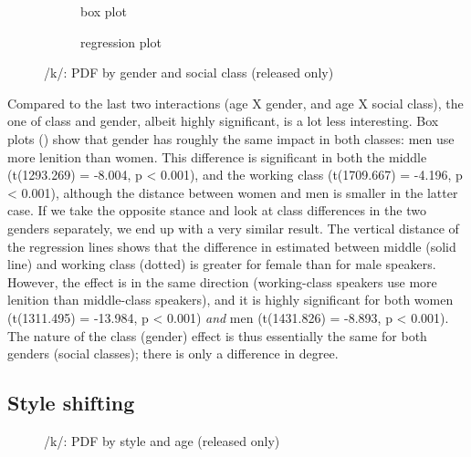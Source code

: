 \begin{figure}[h]
	\centering
	\begin{subfigure}{.49\textwidth}
		\centering
			\resizebox{\linewidth}{!}{} 
		\caption{box plot}
		\label{fig.box.k.classgender}
	\end{subfigure}
	\begin{subfigure}{.49\textwidth}
		\centering
			\resizebox{\linewidth}{!}{} 
		\caption{regression plot}
		\label{fig.scatter.k.classgender}
	\end{subfigure}
	\caption{/k/: PDF by gender and social class (released only)}
\end{figure}

Compared to the last two interactions (age X gender, and age X social class), the one of class and gender, albeit highly significant, is a lot less interesting.
Box plots () show that gender has roughly the same impact in both classes: men use more lenition than women.
This difference is significant in both the middle (t(1293.269) = -8.004, p < 0.001), and the working class (t(1709.667) = -4.196, p < 0.001), although the distance between women and men is smaller in the latter case.
If we take the opposite stance and look at class differences in the two genders separately, we end up with a very similar result.
The vertical distance of the regression lines shows that the difference in estimated  between middle (solid line) and working class (dotted) is greater for female than for male speakers.
However, the effect is in the same direction (working-class speakers use more lenition than middle-class speakers), and it is highly significant for both women (t(1311.495) = -13.984, p < 0.001) \emph{and} men (t(1431.826) = -8.893, p < 0.001).
The nature of the class (gender) effect is thus essentially the same for both genders (social classes); there is only a difference in degree.

\subsection{Style shifting}
\label{sec.prod.res.con.k.shifting}

\begin{figure}[h]
	\centering
		\resizebox{0.5\linewidth}{!}{} 
	\caption{/k/: PDF by style and age (released only)}
	\label{fig.line.k.tot}
\end{figure}


